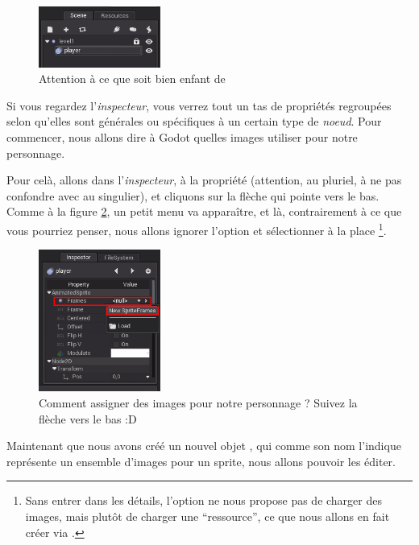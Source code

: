 \begin{figure}
  \begin{center}
    \includegraphics[width=4cm]{img/lvl1-playernode.png}
  \end{center}
  \caption{\label{lvl1-playernode} Attention à ce que  soit bien enfant de }
\end{figure}

Si vous regardez l'\emph{inspecteur}, vous verrez tout un tas de propriétés regroupées selon qu'elles sont générales ou spécifiques à un certain type de \emph{noeud}. Pour commencer, nous allons dire à Godot quelles images utiliser pour notre personnage.

Pour celà, allons dans l'\emph{inspecteur}, à la propriété  (attention, au pluriel, à ne pas confondre avec  au singulier), et cliquons sur la flèche qui pointe vers le bas. Comme à la figure \ref{lvl1-newframes}, un petit menu va apparaître, et là, contrairement à ce que vous pourriez penser, nous allons ignorer l'option  et sélectionner à la place \footnote{Sans entrer dans les détails, l'option  ne nous propose pas de charger des images, mais plutôt de charger une ``ressource'', ce que nous allons en fait créer via .}.

\begin{figure}
  \begin{center}
    \includegraphics[width=4cm]{img/lvl1-newframes.png}
  \end{center}
  \caption{\label{lvl1-newframes} Comment assigner des images pour notre personnage ? Suivez la flèche vers le bas :D}
\end{figure}

Maintenant que nous avons créé un nouvel objet , qui comme son nom l'indique représente un ensemble d'images pour un sprite, nous allons pouvoir les éditer.

